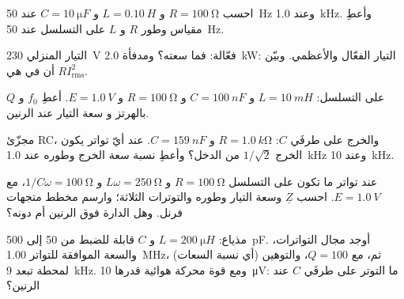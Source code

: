 \begin{exercise}[$\star$]\label{exo:b1:sinusoidal-impedance:2}
احسب  $R = \qty{100}{\ohm}$ و $L = \qty{0.10}{H}$ و
$C = \qty{10}{\micro F}$ عند \qty{50}{Hz} وعند \qty{1.0}{kHz}. وأعطِ
مقياس وطور  $R$ و $L$ على التسلسل عند
\qty{50}{Hz}.
\end{exercise}

\begin{exercise}[$\star$]\label{exo:b1:sinusoidal-impedance:3}
التيار المنزلي \qty{230}{V} فعّالة: فما سعته؟ ومدفأة \qty{2.0}{kW}:
التيار الفعّال والأعظمي. وبيّن أن  في 
هي $RI_{\mathrm{rms}}^2$.
\end{exercise}

\begin{exercise}[$\star$]\label{exo:b1:sinusoidal-impedance:4}
 على التسلسل: $L = \qty{10}{mH}$ و $C = \qty{100}{nF}$ و $R = \qty{100}{\ohm}$
و $E = \qty{1.0}{V}$. أعطِ $f_0$ و $Q$  بالهرتز و
سعة التيار عند الرنين.
\end{exercise}

\begin{exercise}[$\star\star$]\label{exo:b1:sinusoidal-impedance:5}
مجزّئ RC، والخرج على طرفَي $C$: $R = \qty{1.0}{k\ohm}$ و $C = \qty{159}{nF}$.
عند أيّ تواتر يكون الخرج $1/\sqrt2$ من الدخل؟ وأعطِ
نسبة سعة الخرج وطوره عند \qty{1.0}{kHz} وعند \qty{10}{kHz}.
\end{exercise}

\begin{exercise}[$\star\star$]\label{exo:b1:sinusoidal-impedance:6}
عند تواتر ما تكون  على التسلسل $R = \qty{100}{\ohm}$ و $L\omega =
\qty{250}{\ohm}$ و $1/C\omega = \qty{100}{\ohm}$، مع $E = \qty{1.0}{V}$.
احسب $\underline Z$ وسعة التيار وطوره والتوترات
الثلاثة؛ وارسم مخطط متجهات فرنل. وهل الدارة فوق الرنين أم
دونه؟
\end{exercise}

\begin{exercise}[$\star\star$]\label{exo:b1:sinusoidal-impedance:7}
مذياع: $L = \qty{200}{\micro H}$ و $C$ قابلة للضبط من \qty{50}{} إلى
\qty{500}{pF}. أوجد مجال التواترات، والسعة الموافقة للتواتر
\qty{1.00}{MHz}، ثم، مع $Q = 100$،  والتوهين
(أي نسبة السعات) لمحطة تبعد \qty{9}{kHz}. ومع قوة محركة هوائية قدرها
\qty{10}{\micro V}: ما التوتر على طرفَي $C$ عند الرنين؟
\end{exercise}

